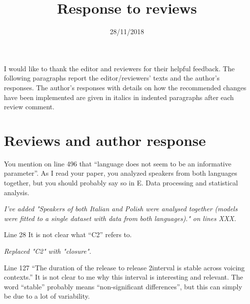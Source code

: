 \documentclass[]{article}
\title{Response to reviews}
\date{28/11/2018}
\begin{document}
\maketitle

I would like to thank the editor and reviewers for their helpful
feedback. The following paragraphs report the editor/reviewers' texts
and the author's responses. The author's responses with details on how
the recommended changes have been implemented are given in italics in
indented paragraphs after each review comment.

\hypertarget{reviews-and-author-response}{%
\section{Reviews and author
response}\label{reviews-and-author-response}}

You mention on line 496 that ``language does not seem to be an
informative parameter''. As I read your paper, you analyzed speakers
from both languages together, but you should probably say so in E. Data
processing and statistical analysis.

\begin{adjustwidth}{1cm}{} \textit{
I've added "Speakers of both Italian and Polish were analysed together (models were fitted to a single dataset with data from both languages)." on lines XXX.
} \end{adjustwidth}

Line 28 It is not clear what ``C2'' refers to.

\begin{adjustwidth}{1cm}{} \textit{
Replaced "C2" with "closure".
} \end{adjustwidth}

Line 127 ``The duration of the release to release 2interval is stable
across voicing contexts.'' It is not clear to me why this interval is
interesting and relevant. The word ``stable'' probably means
``non-significant differences'', but this can simply be due to a lot of
variability.
\end{document}
